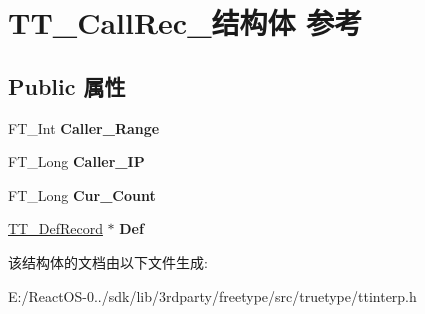 \hypertarget{struct_t_t___call_rec__}{}\section{T\+T\+\_\+\+Call\+Rec\+\_\+结构体 参考}
\label{struct_t_t___call_rec__}
\subsection*{Public 属性}
\begin{DoxyCompactItemize}
\item 
\mbox{\label{struct_t_t___call_rec___a631d8a3ed7df56582a05644fad2d953a}} 
F\+T\+\_\+\+Int {\bfseries Caller\+\_\+\+Range}
\item 
\mbox{\label{struct_t_t___call_rec___abeb634c5ccf5f837a4d7b5a6289e0458}} 
F\+T\+\_\+\+Long {\bfseries Caller\+\_\+\+IP}
\item 
\mbox{\label{struct_t_t___call_rec___a7efaaca0de69401a535b4e93c4301040}} 
F\+T\+\_\+\+Long {\bfseries Cur\+\_\+\+Count}
\item 
\mbox{\label{struct_t_t___call_rec___aebe4a36ee4e43ccd8966fb49221d0ca6}} 
\hyperlink{struct_t_t___def_record__}{T\+T\+\_\+\+Def\+Record} $\ast$ {\bfseries Def}
\end{DoxyCompactItemize}


该结构体的文档由以下文件生成\+:\begin{DoxyCompactItemize}
\item 
E\+:/\+React\+O\+S-\/0../sdk/lib/3rdparty/freetype/src/truetype/ttinterp.\+h\end{DoxyCompactItemize}

